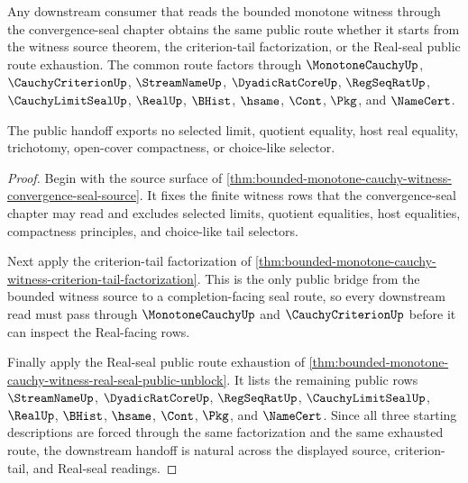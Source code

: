 \begin{theorem}
\label{thm:bounded-monotone-cauchy-witness-seal-route-naturality}
Any downstream consumer that reads the bounded monotone witness through the convergence-seal chapter obtains the same public route whether it starts from the witness source theorem, the criterion-tail factorization, or the Real-seal public route exhaustion. The common route factors through $\MonotoneCauchyUp$, $\CauchyCriterionUp$, $\StreamNameUp$, $\DyadicRatCoreUp$, $\RegSeqRatUp$, $\CauchyLimitSealUp$, $\RealUp$, $\BHist$, $\hsame$, $\Cont$, $\Pkg$, and $\NameCert$.

The public handoff exports no selected limit, quotient equality, host real equality, trichotomy, open-cover compactness, or choice-like selector.
\end{theorem}
\begin{proof}
Begin with the source surface of \autoref{thm:bounded-monotone-cauchy-witness-convergence-seal-source}. It fixes the finite witness rows that the convergence-seal chapter may read and excludes selected limits, quotient equalities, host equalities, compactness principles, and choice-like tail selectors.

Next apply the criterion-tail factorization of \autoref{thm:bounded-monotone-cauchy-witness-criterion-tail-factorization}. This is the only public bridge from the bounded witness source to a completion-facing seal route, so every downstream read must pass through $\MonotoneCauchyUp$ and $\CauchyCriterionUp$ before it can inspect the Real-facing rows.

Finally apply the Real-seal public route exhaustion of \autoref{thm:bounded-monotone-cauchy-witness-real-seal-public-unblock}. It lists the remaining public rows $\StreamNameUp$, $\DyadicRatCoreUp$, $\RegSeqRatUp$, $\CauchyLimitSealUp$, $\RealUp$, $\BHist$, $\hsame$, $\Cont$, $\Pkg$, and $\NameCert$. Since all three starting descriptions are forced through the same factorization and the same exhausted route, the downstream handoff is natural across the displayed source, criterion-tail, and Real-seal readings.
\end{proof}

